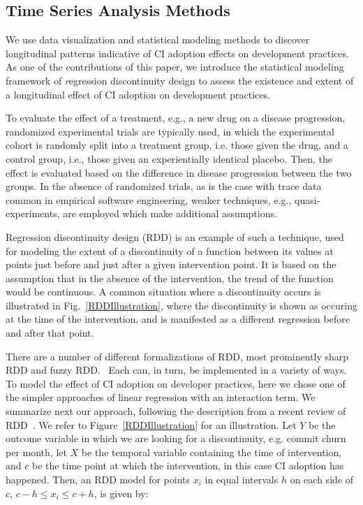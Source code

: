 \subsection{Time Series Analysis Methods}

We use data visualization and statistical modeling methods to discover longitudinal patterns indicative of CI adoption effects on development practices.
As one of the contributions of this paper, we introduce the statistical modeling framework of {\emph regression discontinuity design} to assess the existence and extent of a longitudinal effect of CI adoption on development practices.

To evaluate the effect of a treatment, e.g., a new drug on a disease progression, randomized experimental trials are typically used, in which the experimental cohort is randomly split into a treatment group, i.e. those given the drug, and a control group, i.e., those given an experientially identical placebo. Then, the effect is evaluated based on the difference in disease progression between the two groups.
In the absence of randomized trials, as is the case with trace data common in empirical software engineering, weaker techniques, e.g., quasi-experiments, are employed which make additional assumptions.

Regression discontinuity design (RDD) is an example of such a technique, used for modeling the extent of a discontinuity of a function between its values at points just before and just after a given intervention point. 
It is based on the assumption that in the absence of the intervention, the trend of the function would be continuous.
A common situation where a discontinuity occurs is illustrated in Fig.~\ref{RDDIllustration}, where the discontinuity is shown as occuring at the time of the intervention, and is manifested as a different regression before and after that point.

There are a number of different formalizations of RDD, most prominently sharp RDD and fuzzy RDD.~\cite{}
Each can, in turn, be implemented in a variety of ways.
To model the effect of CI adoption on developer practices, here we chose one of the simpler approaches of linear regression with an interaction term.
We summarize next our approach, following the description from a recent review of RDD~\cite{}. We refer to Figure~\ref{RDDIllustration} for an illustration.
Let $Y$ be the outcome variable in which we are looking for a discontinuity, e.g. commit churn per month, let $X$ be the temporal variable containing the time of intervention, and $c$ be the time point at which the intervention, in this case CI adoption has happened.
Then, an RDD model for points $x_i$ in equal intervals $h$ on each side of $c$, $c-h \le x_i \le c+h$, is given by:

